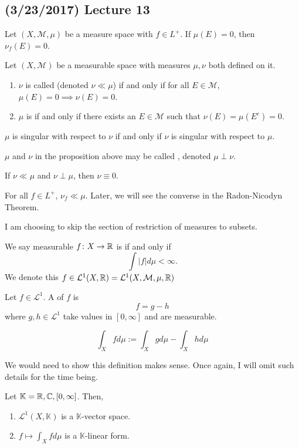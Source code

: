 \documentclass[11pt,leqno,oneside]{amsbook}
\numberwithin{thm}{section}
\newcommand{\M}{\mathcal{M}}
\newcommand{\cL}{\mathcal{L}}
\begin{document}
\subsection*{(3/23/2017) Lecture 13}
\begin{prop}
  Let \((X,\M,\mu)\) be a measure space with \(f \in L^+\). If
  \(\mu(E) = 0\), then \(\nu_f(E) = 0\).
\end{prop}
\begin{defn}
  Let \((X,\M)\) be a measurable space with measures \(\mu,\nu\) both
  defined on it.
  \begin{enumerate}
  \item \(\nu\) is called  (denoted \(\nu \ll \mu\)) if and only if for all \(E
    \in \M\), \(\mu(E) = 0 \implies \nu(E) = 0\).
  \item \(\mu\) is  if and only
    if there exists an \(E \in \M\) such that \(\nu(E) = \mu(E^c) =
    0\). 
  \end{enumerate}
\end{defn}
\begin{prop}
  \(\mu\) is singular with respect to \(\nu\) if and only if \(\nu\)
  is singular with respect to \(\mu\).
\end{prop}
\begin{defn}
  \(\mu\) and \(\nu\) in the proposition above may be called
  , denoted \(\mu \perp \nu\). 
\end{defn}
\begin{rmk}
  If \(\nu \ll \mu\) and \(\nu \perp \mu\), then \(\nu \equiv 0\).
\end{rmk}
\begin{rmk}
  For all \(f \in L^+\), \(\nu_f \ll \mu\). Later, we will see the
  converse in the Radon-Nicodyn Theorem.
\end{rmk}
I am choosing to skip the section of restriction of measures to
subsets.
\begin{defn}
  We say measurable \(f \colon X \to {\mathbb R}\) is  if and only if \[
    \int |f| d\mu < \infty.
  \]
  We denote this \(f \in \cL^1(X,\R) = \cL^1(X,\M,\mu,\R)\)
\end{defn}
\begin{defn}
  Let \(f \in \cL^1\). A  of \(f\) is \[
    f = g-h
  \]
  where \(g,h \in \cL^1\) take values in \([0,\infty]\) and are
  measurable.
\end{defn}
\begin{defn}
  \[
    \int_X f d\mu := \int_X g d\mu - \int_X h d\mu
  \]
\end{defn}
We would need to show this definition makes sense. Once again, I will
omit such details for the time being.
\begin{prop}
  Let \(\mathbb{K} = {\mathbb R},{\mathbb C},[0,\infty]\). Then,
  \begin{enumerate}
  \item \(\cL^1(X,\mathbb{K})\) is a \(\mathbb{K}\)-vector space.
  \item \(f \mapsto \int_X f d\mu\) is a \(\mathbb{K}\)-linear form.
  \end{enumerate}
\end{prop}
\end{document}
